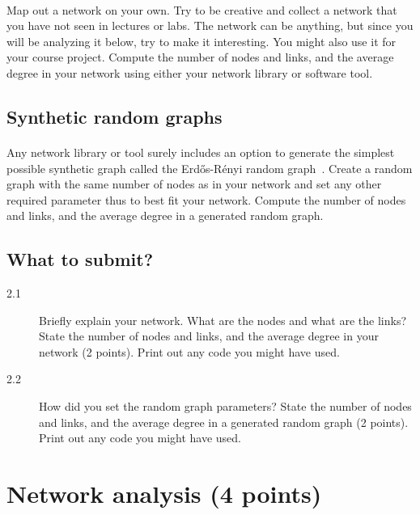 \documentclass[11pt,a4paper]{article}
\begin{document}
\paragraph{} Map out a network on your own. Try to be creative and collect a network that you have not seen in lectures or labs. The network can be anything, but since you will be analyzing it below, try to make it interesting. You might also use it for your course project. Compute the number of nodes and links, and the average degree in your network using either your network library or software tool.

\subsection{Synthetic random graphs}

\paragraph{} Any network library or tool surely includes an option to generate the simplest possible synthetic graph called the Erd\H{o}s-R\'{e}nyi random graph~\cite{ER59}. Create a random graph with the same number of nodes as in your network and set any other required parameter thus to best fit your network. Compute the number of nodes and links, and the average degree in a generated random graph.

\subsection*{What to submit?}

\begin{description}
	\item[2.1] Briefly explain your network. What are the nodes and what are the links? State the number of nodes and links, and the average degree in your network ({\color{magenta}2 points}). Print out any code you might have used.
	\item[2.2] How did you set the random graph parameters? State the number of nodes and links, and the average degree in a generated random graph ({\color{magenta}2 points}). Print out any code you might have used.
\end{description}

\section{Network analysis ({\color{magenta}4 points})}
\end{document}
